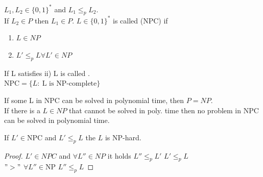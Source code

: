 \begin{lemma}
  $L_{1}, L_{2} \in \{ 0,1 \}^*$ and $L_{1} \leq_{p} L_{2}$.\\
  If $L_{2} \in P$ then $L_{1} \in P$.
  \vspace{0.3cm}
  $L \in \{ 0,1 \}^*$ is called  (NPC) if
  \begin{enumerate}
    \item $L \in NP$
    \item $L' \leq_{p} L \forall L' \in NP$
  \end{enumerate}
  If L satisfies ii) L is called .\\
  $\text{NPC} = \{ L: ~ \text{L is NP-complete} \}$
\end{lemma}

\begin{lemma}
  If some L in NPC can be solved in polynomial time, then $P=NP$.\\
  If there is a $L \in NP$ that cannot be solved in poly. time then no problem in NPC can be solved in polynomial time.
\end{lemma}

\begin{lemma}
  If $L' \in \text{NPC}$ and $L' \leq_{p} L$ the $L$ is NP-hard.
\end{lemma}

\begin{proof}{}
 $L' \in NPC$ and $\forall L'' \in NP$ it holds $L'' \leq_{p} L'$ $L' \leq_{p} L$ \\
 $">"$ $\forall L'' \in \text{NP}$ $L'' \leq_{p} L$
\end{proof}

